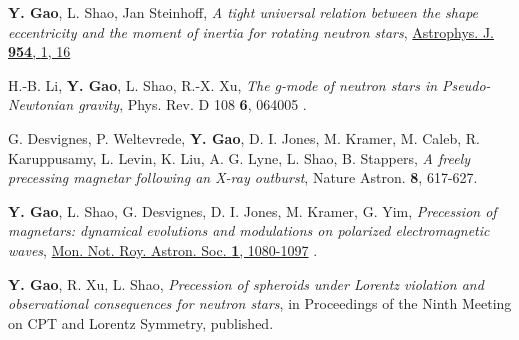 \begin{etaremune}
  {\bf Y. Gao},
  L. Shao,
  Jan Steinhoff,
  {\it A tight universal relation between the shape eccentricity and the moment of inertia for rotating neutron stars},
  \href{https://iopscience.iop.org/article/10.3847/1538-4357/ace776}{Astrophys. J. {\bf 954}, {1}, 16}
  \item
  H.-B. Li, 
  {\bf Y. Gao}, 
  L. Shao, 
  R.-X. Xu, 
  {\it The g-mode of neutron stars in Pseudo-Newtonian gravity}, 
  Phys. Rev. D 108 {\bf 6}, 064005
  .
  \item
  G. Desvignes, 
  P. Weltevrede, 
  {\bf Y. Gao}, 
  D. I. Jones, 
  M. Kramer, 
  M. Caleb, 
  R. Karuppusamy, 
  L. Levin, 
  K. Liu, 
  A. G. Lyne, 
  L. Shao, 
  B. Stappers, 
  {\it A freely precessing magnetar following an X-ray outburst}, 
  Nature Astron. {\bf 8}, 617-627.
  \item  
  {\bf Y. Gao},
  L. Shao,
  G. Desvignes,
  D. I. Jones,
  M. Kramer,
  G. Yim,
  {\it Precession of magnetars: dynamical evolutions and modulations on polarized electromagnetic waves}, \href{https://doi.org/10.1093/mnras/stac3546}{Mon. Not. Roy. Astron. Soc. {\bf 1}, 1080-1097}
  .
  \item 
  {\bf Y. Gao}, 
  R. Xu, 
  L. Shao, 
  {\it Precession of spheroids under Lorentz violation and observational consequences for neutron stars}, 
  in Proceedings of the Ninth Meeting on CPT and Lorentz Symmetry, published.


\end{etaremune}
